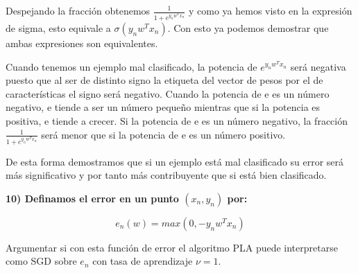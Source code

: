 \documentclass[]{article}
\begin{document}
Despejando la fracción obtenemos \(\frac{1}{1+e^{y_nw^Tx_n}}\) y como ya
hemos visto en la expresión de sigma, esto equivale a
\(\sigma(y_nw^Tx_n)\). Con esto ya podemos demostrar que ambas
expresiones son equivalentes.

Cuando tenemos un ejemplo mal clasificado, la potencia de
\(e^{y_nw^Tx_n}\) será negativa puesto que al ser de distinto signo la
etiqueta del vector de pesos por el de características el signo será
negativo. Cuando la potencia de e es un número negativo, e tiende a ser
un número pequeño mientras que si la potencia es positiva, e tiende a
crecer. Si la potencia de e es un número negativo, la fracción
\(\frac{1}{1+e^{y_nw^Tx_n}}\) será menor que si la potencia de e es un
número positivo.

De esta forma demostramos que si un ejemplo está mal clasificado su
error será más significativo y por tanto más contribuyente que si está
bien clasificado.

\textbf{10) Definamos el error en un punto \((x_n, y_n)\) por:}

\[e_n(w) = max(0, -y_nw^Tx_n)\]

Argumentar si con esta función de error el algoritmo PLA puede
interpretarse como SGD sobre \(e_n\) con tasa de aprendizaje \(ν = 1\).
\end{document}
